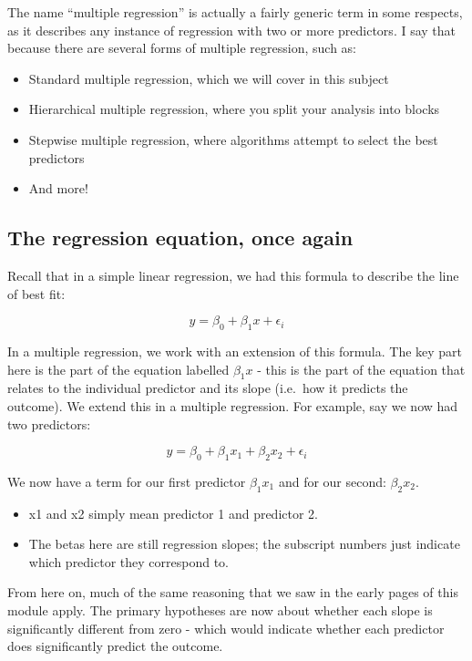 \documentclass[
]{book}
\providecommand{\tightlist}{%
  \setlength{\itemsep}{0pt}\setlength{\parskip}{0pt}}
\begin{document}
The name ``multiple regression'' is actually a fairly generic term in some respects, as it describes any instance of regression with two or more predictors. I say that because there are several forms of multiple regression, such as:

\begin{itemize}
\tightlist
\item
  Standard multiple regression, which we will cover in this subject
\item
  Hierarchical multiple regression, where you split your analysis into blocks
\item
  Stepwise multiple regression, where algorithms attempt to select the best predictors
\item
  And more!
\end{itemize}

\subsection{The regression equation, once again}\label{the-regression-equation-once-again}

Recall that in a simple linear regression, we had this formula to describe the line of best fit:

\[
y = \beta_0 + \beta_1x + \epsilon_i
\]

In a multiple regression, we work with an extension of this formula. The key part here is the part of the equation labelled \(\beta_1x\) - this is the part of the equation that relates to the individual predictor and its slope (i.e.~how it predicts the outcome). We extend this in a multiple regression. For example, say we now had two predictors:

\[
y = \beta_0 + \beta_1x_1 +\beta_2x_2 + \epsilon_i
\]

We now have a term for our first predictor \(\beta_1x_1\) and for our second: \(\beta_2x_2\).

\begin{itemize}
\tightlist
\item
  x1 and x2 simply mean predictor 1 and predictor 2.
\item
  The betas here are still regression slopes; the subscript numbers just indicate which predictor they correspond to.
\end{itemize}

From here on, much of the same reasoning that we saw in the early pages of this module apply. The primary hypotheses are now about whether each slope is significantly different from zero - which would indicate whether each predictor does significantly predict the outcome.
\end{document}
